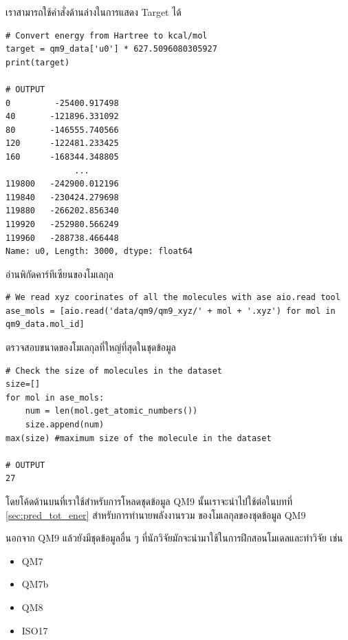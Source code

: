 \noindent เราสามารถใช้คำสั่งด้านล่างในการแสดง Target ได้

\begin{lstlisting}[style=MyPython]
# Convert energy from Hartree to kcal/mol
target = qm9_data['u0'] * 627.5096080305927 
print(target)

# OUTPUT
0         -25400.917498
40       -121896.331092
80       -146555.740566
120      -122481.233425
160      -168344.348805
              ...      
119800   -242900.012196
119840   -230424.279698
119880   -266202.856340
119920   -252980.566249
119960   -288738.466448
Name: u0, Length: 3000, dtype: float64
\end{lstlisting}

\noindent อ่านพิกัดคาร์ทีเซียนของโมเลกุล

\begin{lstlisting}[style=MyPython]
# We read xyz coorinates of all the molecules with ase aio.read tool
ase_mols = [aio.read('data/qm9/qm9_xyz/' + mol + '.xyz') for mol in qm9_data.mol_id]
\end{lstlisting}

\noindent ตรวจสอบขนาดของโมเลกุลที่ใหญ่ที่สุดในชุดข้อมูล

\begin{lstlisting}[style=MyPython]
# Check the size of molecules in the dataset
size=[]
for mol in ase_mols:
    num = len(mol.get_atomic_numbers())
    size.append(num)
max(size) #maximum size of the molecule in the dataset

# OUTPUT
27
\end{lstlisting}

โดยโค้ดด้านบนที่เราใช้สำหรับการโหลดชุดข้อมูล QM9 นั้นเราจะนำไปใช้ต่อในบทที่ \ref{sec:pred_tot_ener} สำหรับการทำนายพลังงานรวม%
ของโมเลกุลของชุดข้อมูล QM9

นอกจาก QM9 แล้วยังมีชุดข้อมูลอื่น ๆ ที่นักวิจัยมักจะนำมาใช้ในการฝึกสอนโมเดลและทำวิจัย เช่น 

\begin{itemize}[topsep=0pt]
    \item QM7\autocite{blum2009,rupp2012a}
    
    \item QM7b\autocite{blum2009,montavon2013}
    
    \item QM8\autocite{ruddigkeit2012,ramakrishnan2015}
    
    \item ISO17\autocite{schutt2017,schutt2017a,ramakrishnan2014}
\end{itemize}

